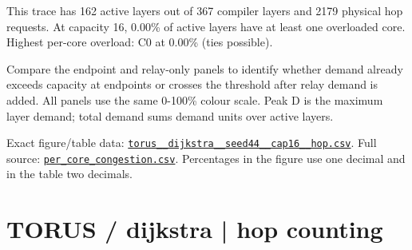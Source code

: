 \documentclass[10pt,a4paper]{article}
\begin{document}
This trace has 162 active layers out of 367 compiler layers and 2179 physical hop requests. At capacity 16, 0.00\% of active layers have at least one overloaded core. Highest per-core overload: C0 at 0.00\% (ties possible).\par
Compare the endpoint and relay-only panels to identify whether demand already exceeds capacity at endpoints or crosses the threshold after relay demand is added. All panels use the same 0-100\% colour scale. Peak D is the maximum layer demand; total demand sums demand units over active layers.\par
Exact figure/table data: \href{\detokenize{file:///home/dhruv-pansuriya/Documents/BTP/Compiler-Driven-ACE/output/pdf/qaoa_methods_congestion/tables/torus__dijkstra__seed44__cap16__hop.csv}}{\nolinkurl{torus__dijkstra__seed44__cap16__hop.csv}}. Full source: \href{\detokenize{file:///home/dhruv-pansuriya/Documents/BTP/Compiler-Driven-ACE/results/qaoa_2seed_2026-10-26/congestion/per_core_congestion.csv}}{\nolinkurl{per_core_congestion.csv}}. Percentages in the figure use one decimal and in the table two decimals.\par
\clearpage
\section*{TORUS / dijkstra | hop counting}
\end{document}
